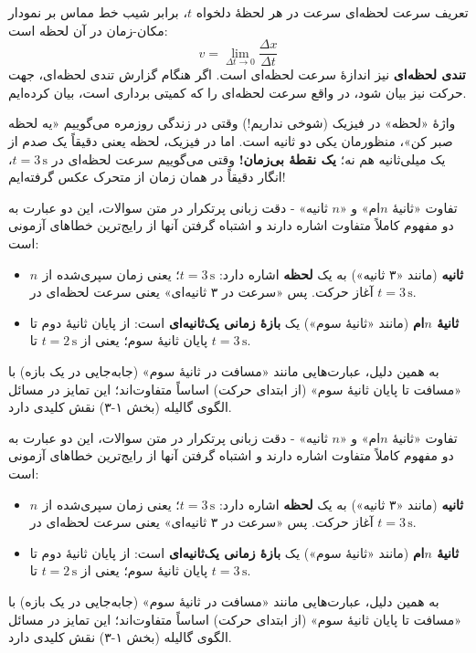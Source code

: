 \documentclass[12pt, a4paper]{article}
\begin{document}
\begin{conceptbox}{تعریف سرعت لحظه‌ای}
سرعت در هر لحظهٔ دلخواه $t$، برابر شیب خط مماس بر نمودار مکان-زمان در آن لحظه است:
\[
v = \lim_{\Delta t \to 0} \frac{\Delta x}{\Delta t}
\]
\textbf{تندی لحظه‌ای} نیز اندازهٔ سرعت لحظه‌ای است. اگر هنگام گزارش تندی لحظه‌ای، جهت حرکت نیز بیان شود، در واقع سرعت لحظه‌ای را که کمیتی برداری است، بیان کرده‌ایم.
\end{conceptbox}

\begin{tipbox}{واژهٔ «لحظه» در فیزیک (شوخی نداریم!)}
وقتی در زندگی روزمره می‌گوییم «یه لحظه صبر کن»، منظورمان یکی دو ثانیه است. اما در فیزیک، لحظه یعنی دقیقاً یک صدم از یک میلی‌ثانیه هم نه؛ \textbf{یک نقطهٔ بی‌زمان!} وقتی می‌گوییم سرعت لحظه‌ای در $t=3\,\text{s}$، انگار دقیقاً در همان زمان از متحرک عکس گرفته‌ایم!
\end{tipbox}

\begin{tipbox}{تفاوت «ثانیهٔ $n$‌ام» و «$n$ ثانیه» - دقت زبانی پرتکرار}
در متن سوالات، این دو عبارت به دو مفهوم کاملاً متفاوت اشاره دارند و اشتباه گرفتن آنها از رایج‌ترین خطاهای آزمونی است:
\begin{itemize}
    \item \textbf{$n$ ثانیه} (مانند «۳ ثانیه») به یک \textbf{لحظه} اشاره دارد: $t = 3\,\text{s}$؛ یعنی زمان سپری‌شده از آغاز حرکت. پس «سرعت در ۳ ثانیه‌ای» یعنی سرعت لحظه‌ای در $t=3\,\text{s}$.
    \item \textbf{ثانیهٔ $n$‌ام} (مانند «ثانیهٔ سوم») یک \textbf{بازهٔ زمانی یک‌ثانیه‌ای} است: از پایان ثانیهٔ دوم تا پایان ثانیهٔ سوم؛ یعنی از $t=2\,\text{s}$ تا $t=3\,\text{s}$.
\end{itemize}
به همین دلیل، عبارت‌هایی مانند «مسافت در ثانیهٔ سوم» (جابه‌جایی در یک بازه) با «مسافت تا پایان ثانیهٔ سوم» (از ابتدای حرکت) اساساً متفاوت‌اند؛ این تمایز در مسائل الگوی گالیله (بخش ۱-۳) نقش کلیدی دارد.
\end{tipbox}

\begin{tipbox}{تفاوت «ثانیهٔ $n$‌ام» و «$n$ ثانیه» - دقت زبانی پرتکرار}
در متن سوالات، این دو عبارت به دو مفهوم کاملاً متفاوت اشاره دارند و اشتباه گرفتن آنها از رایج‌ترین خطاهای آزمونی است:
\begin{itemize}
    \item \textbf{$n$ ثانیه} (مانند «۳ ثانیه») به یک \textbf{لحظه} اشاره دارد: $t = 3\,\text{s}$؛ یعنی زمان سپری‌شده از آغاز حرکت. پس «سرعت در ۳ ثانیه‌ای» یعنی سرعت لحظه‌ای در $t=3\,\text{s}$.
    \item \textbf{ثانیهٔ $n$‌ام} (مانند «ثانیهٔ سوم») یک \textbf{بازهٔ زمانی یک‌ثانیه‌ای} است: از پایان ثانیهٔ دوم تا پایان ثانیهٔ سوم؛ یعنی از $t=2\,\text{s}$ تا $t=3\,\text{s}$.
\end{itemize}
به همین دلیل، عبارت‌هایی مانند «مسافت در ثانیهٔ سوم» (جابه‌جایی در یک بازه) با «مسافت تا پایان ثانیهٔ سوم» (از ابتدای حرکت) اساساً متفاوت‌اند؛ این تمایز در مسائل الگوی گالیله (بخش ۱-۳) نقش کلیدی دارد.
\end{tipbox}
\end{document}
